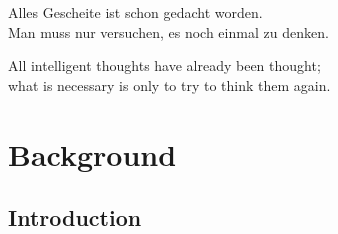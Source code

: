 \begin{savequote}[8cm]
    Alles Gescheite ist schon gedacht worden.\\
    Man muss nur versuchen, es noch einmal zu denken.

    All intelligent thoughts have already been thought;\\
    what is necessary is only to try to think them again.
\end{savequote}

\chapter{\label{ch:2-litreview}Background}

\minitoc

\section{Introduction}


